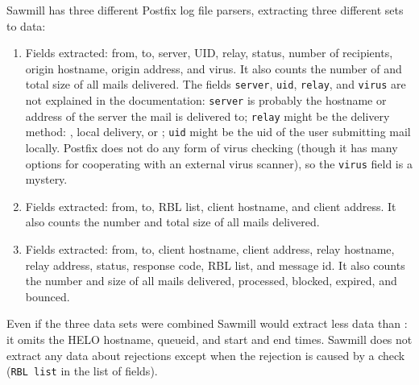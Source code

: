Sawmill has three different Postfix log file parsers, extracting three
different sets to data:

\begin{enumerate}

    \item
        \newline{} Fields extracted: from, to, server, UID, relay, status,
        number of recipients, origin hostname, origin  address,
        and virus.  It also counts the number of and total size of all
        mails delivered.  The fields \texttt{server}, \texttt{uid},
        \texttt{relay}, and \texttt{virus} are not explained in the
        documentation: \texttt{server} is probably the hostname or
         address of the server the mail is delivered to;
        \texttt{relay} might be the delivery method: , local
        delivery, or ; \texttt{uid} might be the uid of the
        user submitting mail locally.  Postfix does not do any form of
        virus checking (though it has many options for cooperating with an
        external virus scanner), so the \texttt{virus} field is a mystery.

    \item
        \newline{} Fields extracted: from, to, RBL list, client hostname,
        and client  address.  It also counts the number and
        total size of all mails delivered.  

    \item
        \newline{} Fields extracted: from, to, client hostname, client
         address, relay hostname, relay  address,
        status, response code, RBL list, and message id.  It also counts
        the number and size of all mails delivered, processed, blocked,
        expired, and bounced.

\end{enumerate}

Even if the three data sets were combined Sawmill would extract less data
than \parsername{}: it omits the HELO hostname, queueid, and start and end
times.  Sawmill does not extract any data about rejections except when the
rejection is caused by a  check (\texttt{RBL list} in the
list of fields).

